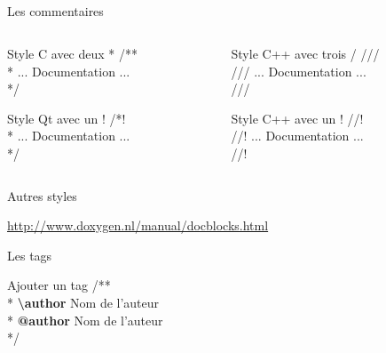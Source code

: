 \documentclass{beamer}
\begin{document}
\subsection{}
\begin{frame}{Les commentaires}

\begin{columns}
\begin{column}{0.5\linewidth}
\begin{exampleblock}{Style C avec deux *}
/**\\
 * ... Documentation ...\\
 */\\
\end{exampleblock}

\begin{block}{Style Qt avec un !}
/*!\\
 * ... Documentation ...\\
 */
\end{block}
\end{column}
\begin{column}{0.5\linewidth}
\begin{block}{Style C++ avec trois /}
///\\
/// ... Documentation ...\\
///
\end{block}
\begin{block}{Style C++ avec un !}
//!\\
//! ... Documentation ...\\
//!
\end{block}
\end{column}
\end{columns}


\begin{block}{Autres styles}
\begin{scriptsize}
\url{http://www.doxygen.nl/manual/docblocks.html}
\end{scriptsize}
\end{block}

\end{frame}

\begin{frame}{Les tags}
\begin{block}{Ajouter un tag}
/**\\
 * \textcolor{dgreen}{\textbf{\textbackslash{}author}} Nom de l'auteur\\
 * \textcolor{dgreen}{\textbf{@author}} Nom de l'auteur\\
 */\\
\end{block}
\end{frame}
\end{document}
